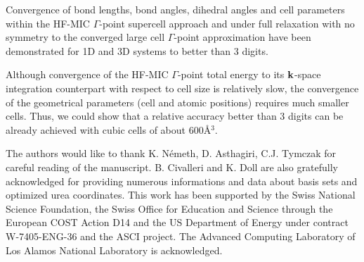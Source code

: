 \documentclass[prl,preprint,doublespace]{revtex4} %
\begin{document}
Convergence of bond lengths, bond angles, 
dihedral angles and cell parameters within the HF-MIC $\Gamma$-point
supercell approach and under full relaxation with no symmetry 
to the converged large cell $\Gamma$-point approximation have
been demonstrated for 1D and 3D systems to better than 3 digits.

Although convergence of the HF-MIC $\Gamma$-point total energy to 
its ${\bf k}$-space integration counterpart with respect to cell size is relatively slow,
the convergence of the geometrical parameters (cell and atomic positions)
requires much smaller cells. Thus, we could show that a relative accuracy better
than 3 digits can be already achieved with cubic cells of about $600$\AA$^3$.
\\
\begin{acknowledgments}
 The authors would like to thank K. N\'emeth, D. Asthagiri, C.J. Tymczak 
 for careful reading of the manuscript. B. Civalleri and K. Doll 
 are also gratefully acknowledged for providing numerous informations 
 and data about basis sets and optimized urea coordinates.
 This work has been supported by the Swiss National Science Foundation, 
 the Swiss Office for Education and Science through the European 
 COST Action D14 and the US Department of Energy 
 under contract W-7405-ENG-36 and the ASCI project.  
 The Advanced Computing Laboratory of Los 
 Alamos National Laboratory is acknowledged.
\end{acknowledgments}  

\end{document}
